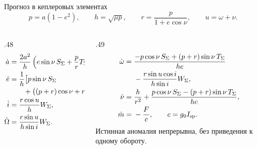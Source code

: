 \documentclass[11pt,aspectratio=169,t]{beamer}
\newcommand{\eqcompact}{\fontsize{10}{12}\selectfont}
\newcommand{\derivationmathspacing}{%
  \setlength{\abovedisplayskip}{2pt}%
  \setlength{\belowdisplayskip}{3pt}%
  \setlength{\abovedisplayshortskip}{2pt}%
  \setlength{\belowdisplayshortskip}{2pt}%
  \setlength{\jot}{2pt}}
\begin{document}
\begin{frame}{Прогноз в кеплеровых элементах}
\relax
\derivationmathspacing
{\eqcompact\derivationmathspacing
\[
 p=a(1-e^2),\qquad h=\sqrt{\mu p},\qquad
 r=\frac p{1+e\cos\nu},\qquad u=\omega+\nu.
\]
}
\begin{columns}[T,onlytextwidth]
\begin{column}{.48\textwidth}
{\eqcompact\derivationmathspacing
\[
\begin{aligned}
 \dot a&=\frac{2a^2}{h}
 \left(e\sin\nu\,S_\Sigma+\frac pr T_\Sigma\right),\\
 \dot e&=\frac1h\bigl[p\sin\nu\,S_\Sigma\\[-2pt]
 &\hspace{7mm}+\bigl((p+r)\cos\nu+re\bigr)T_\Sigma\bigr],\\
 \dot i&=\frac{r\cos u}{h}W_\Sigma,\\
 \dot\Omega&=\frac{r\sin u}{h\sin i}W_\Sigma.
\end{aligned}
\]
}
\end{column}
\begin{column}{.49\textwidth}
{\eqcompact\derivationmathspacing
\[
\begin{aligned}
 \dot\omega={}&\frac{-p\cos\nu\,S_\Sigma+(p+r)\sin\nu\,T_\Sigma}{he}\\
 &-\frac{r\sin u\cos i}{h\sin i}W_\Sigma,\\
 \dot\nu={}&\frac h{r^2}
 +\frac{p\cos\nu\,S_\Sigma-(p+r)\sin\nu\,T_\Sigma}{he},\\
 \dot m={}&-\frac Fc,\qquad c=g_0I_{\rm sp}.
\end{aligned}
\]
}
\justifying
Истинная аномалия непрерывна, без приведения к одному обороту.
\end{column}
\end{columns}
\end{frame}
\end{document}
